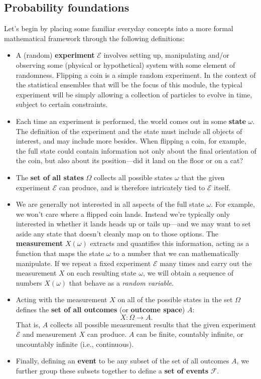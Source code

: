 \documentclass[12 pt]{article}
\newcommand{\cE}{\ensuremath{\mathcal E} }
\newcommand{\cF}{\ensuremath{\mathcal F} }
\newcommand{\om}{\ensuremath{\omega} }
\newcommand{\Om}{\ensuremath{\Omega} }
\begin{document}
\subsection{Probability foundations}
Let's begin by placing some familiar everyday concepts into a more formal mathematical framework through the following definitions: \\[-24 pt]
\begin{itemize}
  \item A (random) \textbf{experiment} \cE involves setting up, manipulating and/or observing some (physical or hypothetical) system with some element of randomness.
        Flipping a coin is a simple random experiment.
        In the context of the statistical ensembles that will be the focus of this module, the typical experiment will be simply allowing a collection of particles to evolve in time, subject to certain constraints.
  \item Each time an experiment is performed, the world comes out in some \textbf{state} $\om$.
        The definition of the experiment and the state must include all objects of interest, and may include more besides.
        When flipping a coin, for example, the full state could contain information not only about the final orientation of the coin, but also about its position---did it land on the floor or on a cat?
  \item The \textbf{set of all states} \Om collects all possible states \om that the given experiment \cE can produce, and is therefore intricately tied to \cE itself.
  \item We are generally not interested in all aspects of the full state $\om$.
        For example, we won't care where a flipped coin lands.
        Instead we're typically only interested in whether it lands heads up or tails up---and we may want to set aside any state that doesn't cleanly map on to those options.
        The \textbf{measurement} $X(\om)$ extracts and quantifies this information, acting as a function that maps the state \om to a number that we can mathematically manipulate.
        If we repeat a fixed experiment \cE many times and carry out the measurement $X$ on each resulting state $\om$, we will obtain a sequence of numbers $X(\om)$ that behave as a \textit{random variable}.
  \item Acting with the measurement $X$ on all of the possible states in the set $\Om$ defines the \textbf{set of all outcomes} (or \textbf{outcome space}) $A$:
        \begin{equation*}
          X: \Om \to A.
        \end{equation*}
        That is, $A$ collects all possible measurement results that the given experiment \cE and measurement $X$ can produce.
        $A$ can be finite, countably infinite, or uncountably infinite (i.e., continuous).
  \item Finally, defining an \textbf{event} to be any subset of the set of all outcomes $A$, we further group these subsets together to define a \textbf{set of events} $\cF$.
\end{itemize}
\end{document}
